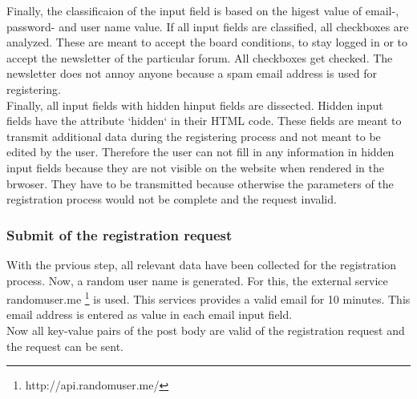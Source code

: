 Finally, the classificaion of the input field is based on the higest value of email-, password- and user name value. If all input fields are classified, all checkboxes are analyzed. These are meant to accept the board conditions, to stay logged in or to accept the newsletter of the particular forum. All checkboxes get checked. The newsletter does not annoy anyone because a spam email address is used for registering. \\
Finally, all input fields with hidden hinput fields are dissected. Hidden input fields have the attribute `hidden` in their HTML code.
These fields are meant to transmit additional data during the registering process and not meant to be edited by the user. Therefore the user can not fill in any information in hidden input fields because they are not visible on the website when rendered in the brwoser. They have to be transmitted because otherwise the parameters of the registration process would not be complete and the request invalid.

\subsubsection{Submit of the registration request}
With the prvious step, all relevant data have been collected for the registration process. Now, a random user name is generated. For this, the external service randomuser.me \footnote{http://api.randomuser.me/} is used. This services provides a valid email for 10 minutes. This email address is entered as value in each email input field.\\
Now all key-value pairs of the post body are valid of the registration request and the request can be sent.

